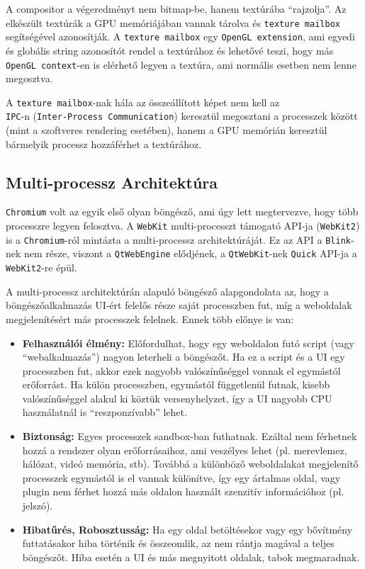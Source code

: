 \documentclass[12pt]{report}
\begin{document}
A compositor a végeredményt nem bitmap-be, hanem textúrába ``rajzolja''. Az elkészült
textúrák a GPU memóriájában vannak tárolva és \texttt{texture mailbox} segítségével
azonosítják. A \texttt{texture mailbox} egy \texttt{OpenGL extension}, ami egyedi és globális
string azonosítót rendel a textúrához és lehetővé teszi, hogy más \texttt{OpenGL context}-en
is elérhető legyen a textúra, ami normális esetben nem lenne megosztva.
\cite{bib-chromium-gpu, bib-chromium-oopifs}

A \texttt{texture mailbox}-nak hála az összeállított képet nem kell az \\
\texttt{IPC}-n (\texttt{Inter-Process Communication}) keresztül megosztani a processzek között
(mint a szoftveres rendering esetében), hanem a GPU memórián keresztül bármelyik
processz hozzáférhet a textúrához.
\cite{bib-chromium-texture-mailbox}

\subsection{Multi-processz Architektúra}
\texttt{Chromium} volt az egyik első olyan böngésző, ami úgy lett megtervezve, hogy több
processzre legyen felosztva. A \texttt{WebKit} multi-processzt támogató
API-ja (\texttt{WebKit2}) is a \texttt{Chromium}-ról mintázta a multi-processz
architektúráját. \cite{bib-webkit-webkit2}
Ez az API a \texttt{Blink}-nek nem része, viszont a \texttt{QtWebEngine} elődjének,
a \texttt{QtWebKit}-nek \texttt{Quick} API-ja a \texttt{WebKit2}-re épül.

A multi-processz architektúrán alapuló böngésző alapgondolata az, hogy a böngészőalkalmazás
UI-ért felelős része saját processzben fut, míg a weboldalak megjelenítésért más
processzek felelnek. Ennek több előnye is van: \cite{bib-chromium-blog-multi-process}
\begin{itemize}
    \item \textbf{Felhasználói élmény:}
        Előfordulhat, hogy egy weboldalon futó script (vagy ``webalkalmazás'')
        nagyon leterheli a böngészőt. Ha ez a script és a UI egy processzben fut,
        akkor ezek nagyobb valószínűséggel vonnak el egymástól erőforrást. Ha külön
        processzben, egymástól függetlenül futnak, kisebb valószínűséggel alakul ki
        köztük versenyhelyzet, így a UI nagyobb CPU használatnál is ``reszponzívabb''
        lehet.
    \item \textbf{Biztonság:}
        Egyes processzek sandbox-ban futhatnak. Ezáltal nem férhetnek hozzá a rendszer
        olyan erőforrásaihoz, ami veszélyes lehet (pl. merevlemez, hálózat,
        videó memória, stb).
        Továbbá a különböző weboldalakat megjelenítő processzek egymástól is el vannak
        különítve, így egy ártalmas oldal, vagy plugin nem férhet hozzá más oldalon használt
        szenzitív információhoz (pl. jelszó).
    \item \textbf{Hibatűrés, Robosztusság:}
        Ha egy oldal betöltésekor vagy egy bővítmény futtatásakor hiba történik és
        összeomlik, az nem rántja magával a teljes böngészőt. Hiba esetén a UI és más
        megnyitott oldalak, tabok megmaradnak.
    \end{itemize}
\end{document}
